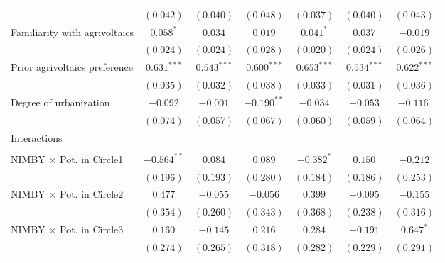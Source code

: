 \begin{center}
\begin{small}
\begin{longtable}{l@{} c@{} c@{} c@{} c@{} c@{} c@{}}
                                    & $(0.042)$        & $(0.040)$     & $(0.048)$     & $(0.037)$       & $(0.040)$     & $(0.043)$        \\
\quad Familiarity with agrivoltaics & $0.058^{*}$      & $0.034$       & $0.019$       & $0.041^{*}$     & $0.037$       & $-0.019$         \\
                                    & $(0.024)$        & $(0.024)$     & $(0.028)$     & $(0.020)$       & $(0.024)$     & $(0.026)$        \\
\quad Prior agrivoltaics preference & $0.631^{***}$    & $0.543^{***}$ & $0.600^{***}$ & $0.653^{***}$   & $0.534^{***}$ & $0.622^{***}$    \\
                                    & $(0.035)$        & $(0.032)$     & $(0.038)$     & $(0.033)$       & $(0.031)$     & $(0.036)$        \\
\quad Degree of urbanization        & $-0.092$         & $-0.001$      & $-0.190^{**}$ & $-0.034$        & $-0.053$      & $-0.116^{\cdot}$ \\
                                    & $(0.074)$        & $(0.057)$     & $(0.067)$     & $(0.060)$       & $(0.059)$     & $(0.064)$        \\
Interactions                        &                  &               &               &                 &               &                  \\
                                    &                  &               &               &                 &               &                  \\
\quad NIMBY × Pot. in Circle1       & $-0.564^{**}$    & $0.084$       & $0.089$       & $-0.382^{*}$    & $0.150$       & $-0.212$         \\
                                    & $(0.196)$        & $(0.193)$     & $(0.280)$     & $(0.184)$       & $(0.186)$     & $(0.253)$        \\
\quad NIMBY × Pot. in Circle2       & $0.477$          & $-0.055$      & $-0.056$      & $0.399$         & $-0.095$      & $-0.155$         \\
                                    & $(0.354)$        & $(0.260)$     & $(0.343)$     & $(0.368)$       & $(0.238)$     & $(0.316)$        \\
\quad NIMBY × Pot. in Circle3       & $0.160$          & $-0.145$      & $0.216$       & $0.284$         & $-0.191$      & $0.647^{*}$      \\
                                    & $(0.274)$        & $(0.265)$     & $(0.318)$     & $(0.282)$       & $(0.229)$     & $(0.291)$        \\

\end{longtable}
\end{small}
\end{center}
